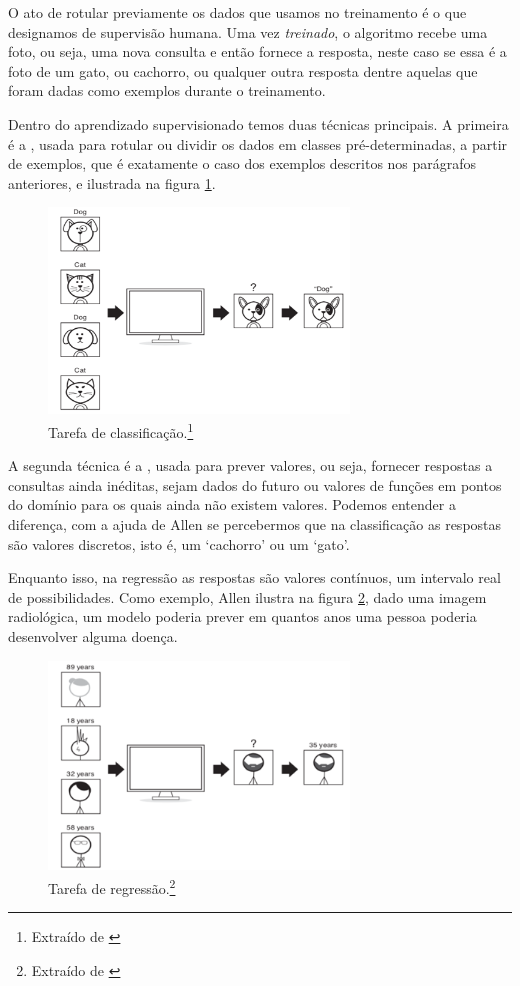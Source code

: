 O ato de rotular previamente os dados que usamos no treinamento é o que designamos de supervisão humana. Uma vez \emph{treinado}, o algoritmo recebe uma foto, ou seja, uma nova consulta e então fornece a resposta, neste caso se essa é a foto de um gato, ou cachorro, ou qualquer outra resposta dentre aquelas que foram dadas como exemplos durante o treinamento.

Dentro do aprendizado supervisionado temos duas técnicas principais. A primeira é a , usada para rotular ou dividir os dados em classes pré-determinadas, a partir de exemplos, que é exatamente o caso dos exemplos descritos nos parágrafos anteriores, e ilustrada na figura \ref{fig:classify}.

\begin{figure}[htb]
\centering
\includegraphics[width=8cm]{figuras/classificacao}
\caption{Tarefa de classificação.\footnote{Extraído de \citep{allen}}}
\label{fig:classify}
\end{figure}

A segunda técnica é a , usada para prever valores, ou seja, fornecer respostas a consultas ainda inéditas, sejam dados do futuro ou valores de funções em pontos do domínio para os quais ainda não existem valores. Podemos entender a diferença, com a ajuda de Allen \citep{allen} se percebermos que na classificação as respostas são valores discretos, isto é, um `cachorro' ou um `gato'. 

Enquanto isso, na regressão as respostas são valores contínuos, um intervalo real de possibilidades. Como exemplo, Allen \citep{allen} ilustra na figura \ref{fig:regressao}, dado uma imagem radiológica, um modelo poderia prever em quantos anos uma pessoa poderia desenvolver alguma doença.

\begin{figure}[htb]
\centering
\includegraphics[width=8cm]{figuras/regressao}
\caption{Tarefa de regressão.\footnote{Extraído de \citep{allen}}}
\label{fig:regressao}
\end{figure}

